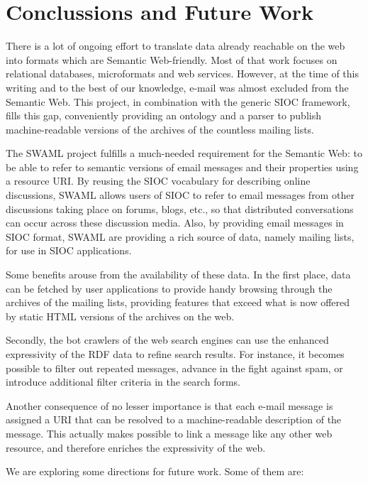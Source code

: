 \documentclass{llncs}
\begin{document}
\section{\label{sec:conclussions}Conclussions and Future Work}

There is a lot of ongoing effort to translate data already reachable
on the web into formats which are Semantic Web-friendly. Most of that 
work focuses on relational databases, microformats and web services. 
However, at the time of this writing and to the best of our knowledge, 
e-mail was almost excluded from the Semantic Web. This project, in 
combination with the generic SIOC framework, fills this gap, conveniently 
providing an ontology and a parser to publish machine-readable versions 
of the archives of the countless mailing lists.

The SWAML project fulfills a much-needed requirement for the Semantic Web: 
to be able to refer to semantic versions of email messages and their 
properties using a resource URI. By reusing the SIOC vocabulary for describing
online discussions, SWAML allows users of SIOC to refer to email messages 
from other discussions taking place on forums, blogs, etc., so that distributed 
conversations can occur across these discussion media. Also, by providing email 
messages in SIOC format, SWAML are providing a rich source of data, namely 
mailing lists, for use in SIOC applications.

Some benefits arouse from the availability of these data. In the first
place, data can be fetched by user applications to provide handy browsing
through the archives of the mailing lists, providing features that
exceed what is now offered by static HTML versions of the archives on
the web.

Secondly, the bot crawlers of the web search engines can use the enhanced
expressivity of the RDF data to refine search results. For instance, it
becomes possible to filter out repeated messages, advance in the fight against
spam, or introduce additional filter criteria in the search forms.

Another consequence of no lesser importance is that each e-mail message
is assigned a URI that can be resolved to a machine-readable description
of the message. This actually makes possible to link a message like
any other web resource, and therefore enriches the expressivity of the
web.

We are exploring some directions for future work. Some of them are:
\end{document}
